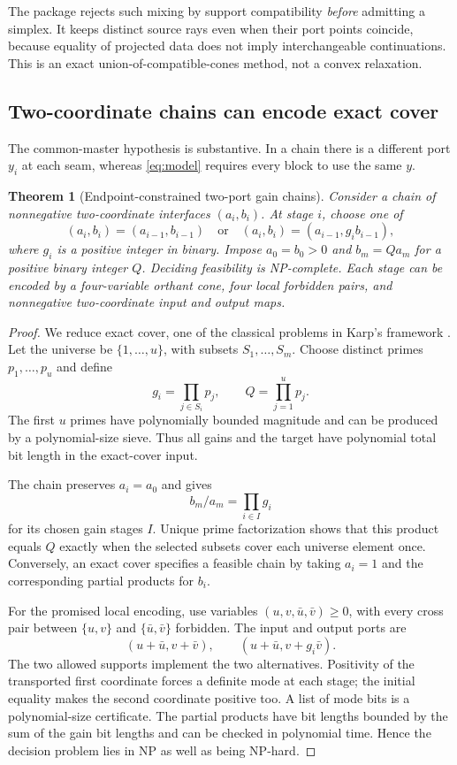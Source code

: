\documentclass[11pt,a4paper]{article}
\newtheorem{theorem}{Theorem}[section]
\theoremstyle{definition}
\theoremstyle{remark}
\begin{document}
The package rejects such mixing by support compatibility \emph{before} admitting a simplex. It keeps distinct source rays even when their port points coincide, because equality of projected data does not imply interchangeable continuations. This is an exact union-of-compatible-cones method, not a convex relaxation.

\subsection{Two-coordinate chains can encode exact cover}
The common-master hypothesis is substantive. In a chain there is a different port $y_i$ at each seam, whereas \eqref{eq:model} requires every block to use the same $y$.

\begin{theorem}[Endpoint-constrained two-port gain chains]
\label{thm:chain}
Consider a chain of nonnegative two-coordinate interfaces $(a_i,b_i)$. At stage $i$, choose one of
\[
 (a_i,b_i)=(a_{i-1},b_{i-1})\quad\text{or}\quad
 (a_i,b_i)=(a_{i-1},g_i b_{i-1}),
\]
where $g_i$ is a positive integer in binary. Impose $a_0=b_0>0$ and $b_m=Qa_m$ for a positive binary integer $Q$. Deciding feasibility is NP-complete. Each stage can be encoded by a four-variable orthant cone, four local forbidden pairs, and nonnegative two-coordinate input and output maps.
\end{theorem}
\begin{proof}
We reduce exact cover, one of the classical problems in Karp's framework \cite{karp}. Let the universe be $\{1,\ldots,u\}$, with subsets $S_1,\ldots,S_m$. Choose distinct primes $p_1,\ldots,p_u$ and define
\[
 g_i=\prod_{j\in S_i}p_j,\qquad Q=\prod_{j=1}^u p_j.
\]
The first $u$ primes have polynomially bounded magnitude and can be produced by a polynomial-size sieve. Thus all gains and the target have polynomial total bit length in the exact-cover input.

The chain preserves $a_i=a_0$ and gives
\[
 b_m/a_m=\prod_{i\in I}g_i
\]
for its chosen gain stages $I$. Unique prime factorization shows that this product equals $Q$ exactly when the selected subsets cover each universe element once. Conversely, an exact cover specifies a feasible chain by taking $a_i=1$ and the corresponding partial products for $b_i$.

For the promised local encoding, use variables $(u,v,\bar u,\bar v)\ge0$, with every cross pair between $\{u,v\}$ and $\{\bar u,\bar v\}$ forbidden. The input and output ports are
\[
 (u+\bar u,v+\bar v),\qquad (u+\bar u,v+g_i\bar v).
\]
The two allowed supports implement the two alternatives. Positivity of the transported first coordinate forces a definite mode at each stage; the initial equality makes the second coordinate positive too. A list of mode bits is a polynomial-size certificate. The partial products have bit lengths bounded by the sum of the gain bit lengths and can be checked in polynomial time. Hence the decision problem lies in NP as well as being NP-hard.
\end{proof}
\end{document}
